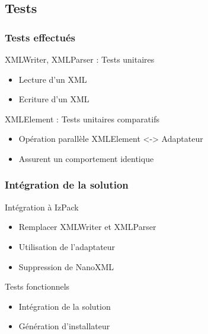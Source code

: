 \subsection{Tests}
\begin{frame}\frametitle{Tests effectués}
\begin{minipage}[c]{.9\linewidth}
	\begin{beamerboxesrounded}[shadow=true]{XMLWriter, XMLParser : Tests unitaires}
		\begin{itemize}
			\item Lecture d'un XML
			\item Ecriture d'un XML
		\end{itemize}
	\end{beamerboxesrounded}
\end{minipage}
\vfill
\begin{minipage}[c]{.9\linewidth}
	\begin{beamerboxesrounded}[shadow=true]{XMLElement : Tests unitaires comparatifs}
		\begin{itemize}
			\item Opération parallèle XMLElement <-> Adaptateur
			\item Assurent un comportement identique
		\end{itemize}
	\end{beamerboxesrounded}
\end{minipage}
\end{frame}
\begin{frame}\frametitle{Intégration de la solution}
\begin{minipage}[c]{.9\linewidth}
	\begin{beamerboxesrounded}[shadow=true]{Intégration à IzPack}
		\begin{itemize}
			\item Remplacer XMLWriter et XMLParser
			\item Utilisation de l'adaptateur
			\item Suppression de NanoXML
		\end{itemize}
	\end{beamerboxesrounded}
\end{minipage}
\vfill
\begin{minipage}[c]{.9\linewidth}
	\begin{beamerboxesrounded}[shadow=true]{Tests fonctionnels}
		\begin{itemize}
			\item Intégration de la solution
			\item Génération d'installateur
		\end{itemize}
	\end{beamerboxesrounded}
\end{minipage}
\end{frame}
